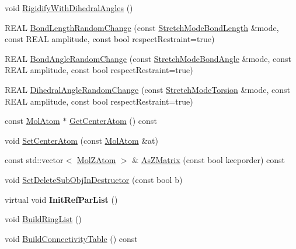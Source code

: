 \begin{DoxyCompactItemize}
\item 
void \mbox{\hyperlink{class_obj_cryst_1_1_molecule_a560c9ffc36d4874b99eb26c198ee485f}{Rigidify\+With\+Dihedral\+Angles}} ()
\item 
R\+E\+AL \mbox{\hyperlink{class_obj_cryst_1_1_molecule_ad7bfddcdf21c1214c5a70c84fc54cdb0}{Bond\+Length\+Random\+Change}} (const \mbox{\hyperlink{struct_obj_cryst_1_1_stretch_mode_bond_length}{Stretch\+Mode\+Bond\+Length}} \&mode, const R\+E\+AL amplitude, const bool respect\+Restraint=true)
\item 
R\+E\+AL \mbox{\hyperlink{class_obj_cryst_1_1_molecule_ad6e27c1557962b32355eeadf1bf155d3}{Bond\+Angle\+Random\+Change}} (const \mbox{\hyperlink{struct_obj_cryst_1_1_stretch_mode_bond_angle}{Stretch\+Mode\+Bond\+Angle}} \&mode, const R\+E\+AL amplitude, const bool respect\+Restraint=true)
\item 
R\+E\+AL \mbox{\hyperlink{class_obj_cryst_1_1_molecule_afd88ae76ab528b5dc37f9d2527353904}{Dihedral\+Angle\+Random\+Change}} (const \mbox{\hyperlink{struct_obj_cryst_1_1_stretch_mode_torsion}{Stretch\+Mode\+Torsion}} \&mode, const R\+E\+AL amplitude, const bool respect\+Restraint=true)
\item 
const \mbox{\hyperlink{class_obj_cryst_1_1_mol_atom}{Mol\+Atom}} $\ast$ \mbox{\hyperlink{class_obj_cryst_1_1_molecule_a2743c40de811e9b4ba8d5f037632572b}{Get\+Center\+Atom}} () const
\item 
void \mbox{\hyperlink{class_obj_cryst_1_1_molecule_a24043736cd4323a31b7bc0fa6fa166da}{Set\+Center\+Atom}} (const \mbox{\hyperlink{class_obj_cryst_1_1_mol_atom}{Mol\+Atom}} \&at)
\item 
const std\+::vector$<$ \mbox{\hyperlink{struct_obj_cryst_1_1_mol_z_atom}{Mol\+Z\+Atom}} $>$ \& \mbox{\hyperlink{class_obj_cryst_1_1_molecule_a8700143ff56fc21bb1262c4d297802ce}{As\+Z\+Matrix}} (const bool keeporder) const
\item 
void \mbox{\hyperlink{class_obj_cryst_1_1_molecule_a19afb1f15773fed7a2d9dff35820bafd}{Set\+Delete\+Sub\+Obj\+In\+Destructor}} (const bool b)
\item 
\mbox{\label{class_obj_cryst_1_1_molecule_a5a8b91eefbc2b7b9f442bce239c4d981}} 
virtual void {\bfseries Init\+Ref\+Par\+List} ()
\item 
void \mbox{\hyperlink{class_obj_cryst_1_1_molecule_a9623bff2259d45c162ed28af73974f5a}{Build\+Ring\+List}} ()
\item 
void \mbox{\hyperlink{class_obj_cryst_1_1_molecule_a45ed440475011a0ceb933f56751c11da}{Build\+Connectivity\+Table}} () const

\end{DoxyCompactItemize}
